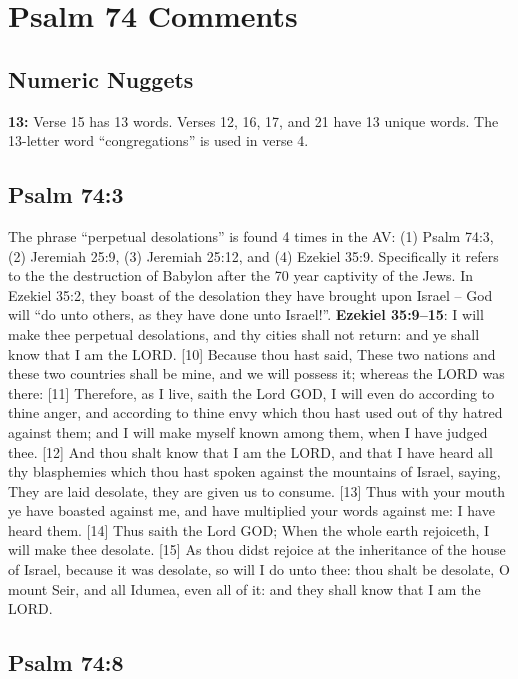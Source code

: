 \section{Psalm 74 Comments}

\subsection{Numeric Nuggets}
\textbf{13: } Verse 15 has 13 words.  Verses 12, 16, 17, and 21 have 13 unique words.  The 13-letter word ``congregations'' is used in verse 4.

\subsection{Psalm 74:3}
The phrase ``perpetual desolations'' is found 4 times in the AV: (1) Psalm 74:3, (2) Jeremiah 25:9, (3) Jeremiah 25:12, and (4) Ezekiel 35:9. Specifically it refers to the the destruction of Babylon after the 70  year captivity of the Jews. In Ezekiel 35:2, they boast of the desolation they have brought upon Israel -- God will ``do unto others, as they have done unto Israel!''. \textbf{Ezekiel 35:9--15}: I will make thee perpetual desolations, and thy cities shall not return: and ye shall know that I am the LORD. [10] Because thou hast said, These two nations and these two countries shall be mine, and we will possess it; whereas the LORD was there: [11] Therefore, as I live, saith the Lord GOD, I will even do according to thine anger, and according to thine envy which thou hast used out of thy hatred against them; and I will make myself known among them, when I have judged thee. [12] And thou shalt know that I am the LORD, and that I have heard all thy blasphemies which thou hast spoken against the mountains of Israel, saying, They are laid desolate, they are given us to consume. [13] Thus with your mouth ye have boasted against me, and have multiplied your words against me: I have heard them. [14] Thus saith the Lord GOD; When the whole earth rejoiceth, I will make thee desolate. [15] As thou didst rejoice at the inheritance of the house of Israel, because it was desolate, so will I do unto thee: thou shalt be desolate, O mount Seir, and all Idumea, even all of it: and they shall know that I am the LORD.\cite{Ruckman1992PsalmsV2}

\subsection{Psalm 74:8}


